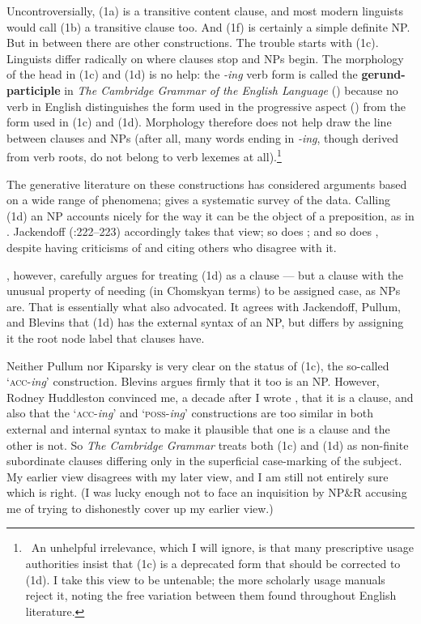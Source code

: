 \documentclass[output=paper,colorlinks,citecolor=brown
]{langscibook}
\begin{document}
\medskip\noindent
Uncontroversially, (1a) is a transitive content clause, and most
modern linguists would call (1b) a transitive clause too.
And (1f) is certainly a simple definite NP. But in between there are
other constructions. The trouble starts with (1c). Linguists differ
radically on where clauses stop and NPs begin.
The morphology of the head in (1c) and (1d) is no help:
the \textit{-ing} verb form is called the \textbf{gerund-participle} in
\textit{The Cambridge Grammar of the English Language}
(\citealt{HuddPull02}) because no verb in English distinguishes the form
used in the progressive aspect () from the form used
in (1c) and (1d). Morphology therefore does not help draw the line
between clauses and NPs (after all, many words ending in
\mbox{\itshape-ing}, though derived from verb roots, do not belong
to verb lexemes at all).\footnote{\,
   An unhelpful irrelevance, which I will ignore, is that many
   prescriptive usage authorities insist that (1c) is a deprecated
   form that should be corrected to (1d). I take this view to be
   untenable; the more scholarly usage manuals reject it, noting the
   free variation between them found throughout English literature.}

The generative literature on these constructions has considered
arguments based on a wide range of phenomena; \citet{Pullum91}
gives a systematic survey of the data. Calling (1d) an NP accounts
nicely for the way it can be the object of a preposition, as in
. Jackendoff
(\citeyear{Jackendoff77}:222--223) accordingly takes that view; so
does \citet{Pullum91}; and so does \citet{Blevins05}, despite having
criticisms of \citet{Pullum91} and citing others who disagree with it.

\citet{Kiparsky17}, however, carefully argues for treating (1d) as
a clause --- but a clause with the unusual property of needing (in
Chomskyan terms) to be assigned case, as NPs are. That is essentially
what \citet{Stowell81} also advocated. It agrees with Jackendoff,
Pullum, and Blevins that (1d) has the external syntax of an NP, but
differs by assigning it the root node label that clauses have.

Neither Pullum nor Kiparsky is very clear on the status of (1c), the
so-called `\textsc{acc}-\textit{ing}' construction. Blevins argues
firmly that it too is an NP. However, Rodney Huddleston convinced me,
a decade after I wrote \citet{Pullum91}, that it is a clause, and also
that the `\textsc{acc}-\textit{ing}' and `\textsc{poss}-\textit{ing}'
constructions are too similar in both external and internal syntax
to make it plausible that one is a clause and the other is not.
So \textit{The Cambridge Grammar} treats both (1c) and (1d) as
non-finite subordinate clauses differing only in the superficial
case-marking of the subject. My earlier view disagrees with my later
view, and I am still not entirely sure which is right. (I was
lucky enough not to face an inquisition by NP\&R accusing me of
trying to dishonestly cover up my earlier view.)
\end{document}
